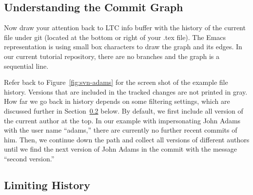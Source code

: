 \subsection{Understanding the Commit Graph}

Now draw your attention back to LTC info buffer with the history of the current file under git (located at the bottom or right of your .tex file).  The Emacs representation is using small box characters to draw the graph and its edges.  In our current tutorial repository, there are no branches and the graph is a sequential line.  

Refer back to Figure~\ref{fig:svn-adams} for the screen shot of the example file history. Versions that are included in the tracked changes are not printed in gray.  How far we go back in history depends on some filtering settings, which are discussed further in Section~\ref{sec:svn-emacs-limit-history} below.  By default, we first include all version of the current author at the top.  In our example with impersonating John Adams with the user name ``adams,'' there are currently no further recent commits of him.  Then, we continue down the path and collect all versions of different authors until we find the next version of John Adams in the commit with the message ``second version.''

\subsection{Limiting History} \label{sec:svn-emacs-limit-history}
